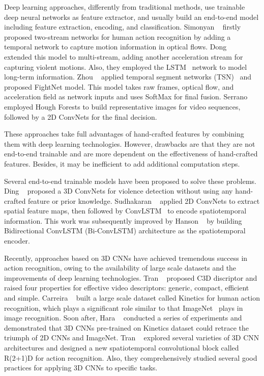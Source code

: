 \documentclass[10pt,twocolumn,letterpaper]{article}
\begin{document}
Deep learning approaches, differently from traditional methods, use trainable deep neural networks as feature extractor, and usually build an end-to-end model including feature extraction, encoding, and classification. 
Simonyan \etal~\cite{two-stream} firstly proposed two-stream networks for human action recognition by adding a temporal network to capture motion information in optical flows.
Dong \etal~\cite{dong2016multi} extended this model to multi-stream, adding another acceleration stream for capturing violent motions. Also, they employed the LSTM~\cite{lstm} network to model long-term information.  
Zhou \etal~\cite{zhou2017violent} applied temporal segment networks (TSN)~\cite{tsn} and proposed FightNet model. This model takes raw frames, optical flow, and acceleration field as network inputs and uses SoftMax for final fusion.
Serrano \etal~\cite{serrano2018fight} employed Hough Forests to build representative images for video sequences, followed by a 2D ConvNets for the final decision.

These approaches take full advantages of hand-crafted features by combining them with deep learning technologies.
However, drawbacks are that they are not end-to-end trainable and are more dependent on the effectiveness of hand-crafted features.
Besides, it may be inefficient to add additional computation steps. 

Several end-to-end trainable models have been proposed to solve these problems.
Ding \etal~\cite{3dcnn_ding} proposed a 3D ConvNets for violence detection without using any hand-crafted feature or prior knowledge. 
Sudhakaran \etal~\cite{convlstm_sudh} applied 2D ConvNets to extract spatial feature maps, then followed by ConvLSTM~\cite{convlstm} to encode spatiotemporal information.
This work was subsequently improved by Hanson \etal~\cite{bi_convlstm} by building Bidirectional ConvLSTM (Bi-ConvLSTM) architecture as the spatiotemporal encoder.

Recently, approaches based on 3D CNNs have achieved tremendous success in action recognition, owing to the availability of large scale datasets and the improvements of deep learning technologies. 
Tran \etal~\cite{3dcnn_1} proposed C3D discriptor and raised four properties for effective video descriptors: generic, compact, efficient and simple. 
Carreira \etal~\cite{kinetics} built a large scale dataset called Kinetics for human action recognition, which plays a significant role similar to that ImageNet~\cite{imagenet} plays in image recognition. 
Soon after, Hara \etal~\cite{3dcnn_2} conducted a series of experiments and demonstrated that 3D CNNs pre-trained on Kinetics dataset could retrace the triumph of 2D CNNs and ImageNet.
Tran \etal~\cite{r2+1d} explored several varieties of 3D CNN architectures and designed a new spatiotemporal convolutional block called R(2+1)D for action recognition.
Also, they comprehensively studied several good practices for applying 3D CNNs to specific tasks.
\end{document}
